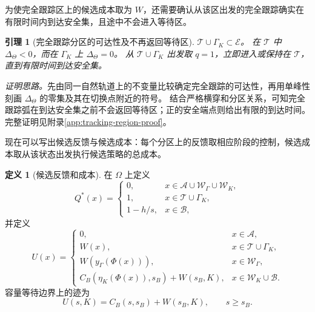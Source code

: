 \documentclass[11pt,a4paper,UTF8]{ctexart}
\newtheorem{lemma}[theorem]{引理}
\theoremstyle{definition}
\newtheorem{definition}[theorem]{定义}
\newcommand{\Acal}{\mathcal A}
\begin{document}
为使完全跟踪区上的候选成本取为 $W$，还需要确认从该区出发的完全跟踪确实在有限时间内到达安全集，且途中不会进入等待区。

\begin{lemma}[完全跟踪分区的可达性及不再返回等待区]
\label{lem:tracking-region}
$\mathcal T\cup\Gamma_K\subset\mathcal E$。
在 $\mathcal T$ 中 $\Delta_\Theta<0$，而在 $\Gamma_K$ 上 $\Delta_\Theta=0$。
从 $\mathcal T\cup\Gamma_K$ 出发取 $q=1$，立即进入或保持在 $\mathcal T$，直到有限时间到达安全集。
\end{lemma}
\emph{证明思路。}先由同一自然轨道上的不变量比较确定完全跟踪的可达性，再用单峰性刻画 $\Delta_\Theta$ 的零集及其在切换点附近的符号。
结合严格横穿和分区关系，可知完全跟踪弧在到达安全集之前不会返回等待区；正的安全端点则给出有限的到达时间。
完整证明见附录\ref{app:tracking-region-proof}。

现在可以写出候选反馈与候选成本：每个分区上的反馈取相应阶段的控制，候选成本取从该状态出发执行候选策略的总成本。

\begin{definition}[候选反馈和成本]
\label{def:candidate}
在 $\Omega$ 上定义
\begin{equation}
Q^*(x)=
\begin{cases}
0,&x\in\Acal\cup\mathcal W_\Gamma\cup\mathcal W_K,\\
1,&x\in\mathcal T\cup\Gamma_K,\\
1-h/s,&x\in\mathcal B,
\end{cases}
\label{eq:candidate-feedback}
\end{equation}
并定义
\begin{equation}
U(x)=
\begin{cases}
0,&x\in\Acal,\\
W(x),&x\in\mathcal T\cup\Gamma_K,\\
W(y_\Gamma(\Phi(x))),&x\in\mathcal W_\Gamma,\\
C_B(\eta_K(\Phi(x)),s_B)+W(s_B,K),&x\in\mathcal W_K\cup\mathcal B.
\end{cases}
\label{eq:candidate-U}
\end{equation}
容量等待边界上的迹为
\begin{equation}
U(s,K)=C_B(s,s_B)+W(s_B,K),\qquad s\ge s_B.
\label{eq:boundary-value}
\end{equation}
\end{definition}
\end{document}
